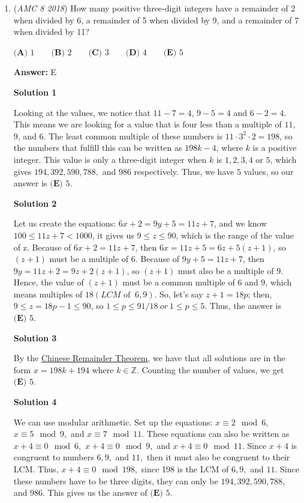 \begin{enumerate}
 


	\item (\textit{AMC 8 2018}) How many positive three-digit integers have a remainder of 2 when divided by 6, a remainder of 5 when divided by 9, and a remainder of 7 when divided by 11?


 $\textbf{(A) }1\qquad\textbf{(B) }2\qquad\textbf{(C) }3\qquad\textbf{(D) }4\qquad \textbf{(E) }5$

 \textbf{Answer: }E



\textbf{Solution 1}

Looking at the values, we notice that $11-7=4$, $9-5=4$ and $6-2=4$. This means we are looking for a value that is four less than a multiple of $11$, $9$, and $6$. The least common multiple of these numbers is $11\cdot3^{2}\cdot2=198$, so the numbers that fulfill this can be written as $198k-4$, where $k$ is a positive integer.  This value is only a three-digit integer when $k$ is $1, 2, 3, 4$ or $5$, which gives $194, 392, 590, 788,$ and $986$ respectively. Thus, we have $5$ values, so our answer is $\boxed{\textbf{(E) }5}$.

 



\textbf{Solution 2}

Let us create the equations: $6x+2 = 9y+5 = 11z+7$, and we know $100 \leq 11z+7 <1000$, it gives us $9 \leq z \leq 90$, which is the range of the value of z. Because of $6x+2=11z+7$, then $6x=11z+5=6z+5(z+1)$, so $(z+1)$ must be a multiple of 6. Because of $9y+5=11z+7$, then $9y=11z+2=9z+2(z+1)$, so $(z+1)$ must also be a multiple of $9$. Hence, the value of $(z+1)$ must be a common multiple of $6$ and $9$, which means multiples of $18 (LCM \text{ of }\ 6, 9)$. So, let's say $z+1 = 18p$; then, $9 \leq z = 18p-1 \leq 90$,  so $1 \leq p \leq 91/18\ or \ 1 \leq p \leq 5$. Thus, the answer is $\boxed{\textbf{(E) }5}$.

 



\textbf{Solution 3}

By the \href{https://artofproblemsolving.com/wiki/index.php?title=Chinese\_Remainder\_Theorem}{Chinese Remainder Theorem}, we have that all solutions are in the form $x=198k+194$ where $k\in \mathbb{Z}.$ Counting the number of values, we get $\boxed{\textbf{(E) }5}.$




\textbf{Solution 4}

We can use modular arithmetic. Set up the equations: $x \equiv 2 \mod 6,$ $x \equiv 5 \mod 9,$ and $x \equiv 7 \mod 11.$ These equations can also be written as $x+4 \equiv 0 \mod 6,$ $x+4 \equiv 0 \mod 9,$ and $x+4 \equiv 0 \mod 11.$ Since $x+4$ is congruent to numbers $6, 9,$ and $11,$ then it must also be congruent to their LCM. Thus, $x+4 \equiv 0 \mod 198,$ since 198 is the LCM of $6, 9,$ and $11.$ Since these numbers have to be three digits, they can only be $194, 392, 590, 788,$ and $986.$ This gives us the answer of $\boxed{\textbf{(E) }5}.$





\end{enumerate}
